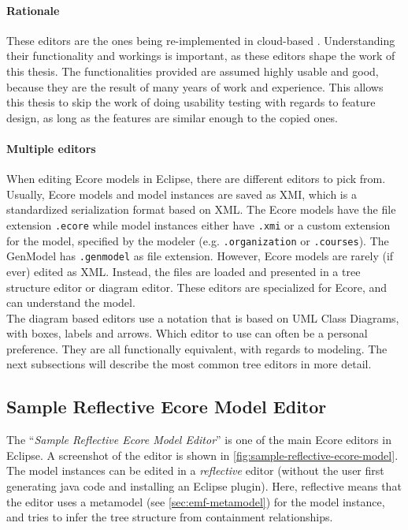 \paragraph{Rationale}
These editors are the ones being re-implemented in \gls{cloud}-based .
Understanding their functionality and workings is important, as these editors shape the work of this thesis.
The functionalities provided are assumed highly usable and good, because they are the result of many years of work and experience.
This allows this thesis to skip the work of doing usability testing with regards to feature design, as long as the features are similar enough to the copied ones.

\paragraph{Multiple editors}
When editing \gls{Ecore} models in \gls{Eclipse}, there are different editors to pick from.
Usually, \gls{Ecore} models and model instances are saved as \acrfull{XMI}, which is a standardized serialization format based on XML.
The \gls{Ecore} models have the file extension \texttt{.ecore} while model instances either have \texttt{.xmi} or a custom extension for the model, specified by the modeler (e.g. \texttt{.organization} or \texttt{.courses}).
The GenModel has \texttt{.genmodel} as file extension.
However, \gls{Ecore} models are rarely (if ever) edited as XML.
Instead, the files are loaded and presented in a tree structure editor or diagram editor.
These editors are specialized for \gls{Ecore}, and can understand the model.\\

The diagram based editors use a notation that is based on \gls{UML} Class Diagrams, with boxes, labels and arrows.
Which editor to use can often be a personal preference.
They are all functionally equivalent, with regards to modeling.
The next subsections will describe the most common tree editors in more detail.

\subsection{Sample Reflective Ecore Model Editor}\label{sec:sample-reflective-editor}

The ``\textit{Sample Reflective Ecore Model Editor}'' is one of the main \gls{Ecore} editors in \gls{Eclipse}.
A screenshot of the editor is shown in \cref{fig:sample-reflective-ecore-model}.
The model instances can be edited in a \textit{reflective} editor (without the user first generating java code and installing an \gls{Eclipse} plugin).
Here, reflective means that the editor uses a metamodel (see \cref{sec:emf-metamodel}) for the model instance, and tries to infer the tree structure from containment relationships.\\

